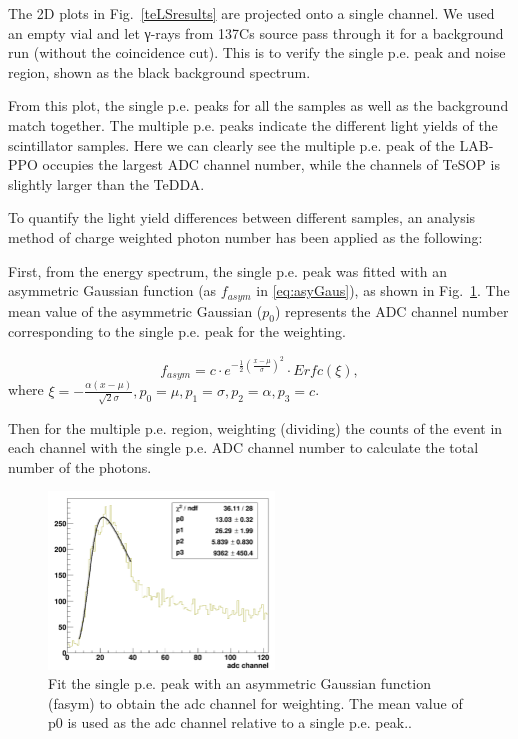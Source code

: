 The 2D plots in Fig.~\ref{teLSresults} are projected onto a single channel. We used an empty vial and let γ-rays from 137Cs source pass through it for a background run (without the coincidence cut). This is to verify the single p.e. peak and noise region, shown as the black background spectrum.

From this plot, the single p.e. peaks for all the samples as well as the background match together. The multiple p.e. peaks indicate the different light yields of the scintillator samples. Here we can clearly see the multiple p.e. peak of the LAB-PPO occupies the largest ADC channel number, while the channels of TeSOP is slightly larger than the TeDDA. 

To quantify the light yield differences between different samples, an analysis method of charge weighted photon number has been applied as the following:

First, from the energy spectrum, the single p.e. peak was fitted with an asymmetric Gaussian function (as $f_{asym}$ in \ref{eq:asyGaus}), as shown in Fig.~\ref{fitSinglePE}. The mean value of the asymmetric Gaussian ($p_0$) represents the ADC channel number corresponding to the single p.e. peak for the weighting. 

\begin{equation}\label{eq:asyGaus}
f_{asym}=c\cdot e^{-\frac{1}{2}(\frac{x-\mu}{\sigma})^2}\cdot Erfc(\xi),
\end{equation}
where $\xi=-\frac{\alpha(x-\mu)}{\sqrt 2\sigma},p_0=\mu,p_1=\sigma,p_2=\alpha, p_3=c$.

Then for the multiple p.e. region, weighting (dividing) the counts of the event in each channel with the single p.e. ADC channel number to calculate the total number of the photons.

\begin{figure}[htbp]
	\centering	
	\includegraphics[width=6cm]{fitSinglePE.png}
	\caption{Fit the single p.e. peak with an asymmetric Gaussian function (fasym) to obtain the adc channel for weighting. The mean value of p0 is used as the adc channel relative to a single p.e. peak..}
	\label{fitSinglePE}
\end{figure}

